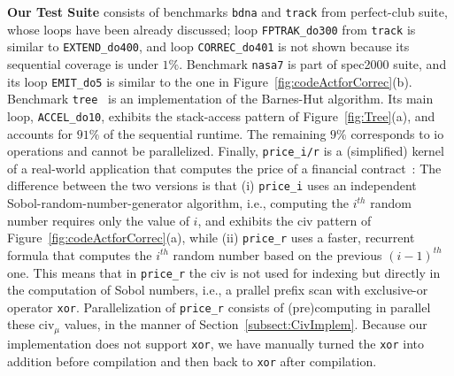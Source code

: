 \documentclass{sig-alternate}
\begin{document}
\vspace{1ex}

{\bf Our Test Suite} consists of benchmarks {\tt bdna} and {\tt track} 
from {\sc perfect-club} suite, whose loops have been already discussed;
loop {\tt FPTRAK\_do300} from {\tt track} is similar to {\tt EXTEND\_do400},
and loop {\tt CORREC\_do401} is not shown because 
its sequential coverage is under $1\%$. 
%
Benchmark {\tt nasa7} is part of {\sc spec2000} suite, and its loop {\tt EMIT\_do5}
is similar to the one in Figure~\ref{fig:codeActforCorrec}(b).
%
Benchmark {\tt tree}~\cite{Treecode} is an implementation of the Barnes-Hut algorithm.
Its main loop, {\tt ACCEL\_do10}, exhibits the stack-access pattern of Figure~\ref{fig:Tree}(a),
and accounts for $91\%$ of the sequential runtime. The remaining $9\%$ corresponds to {\sc io}
operations and cannot be parallelized.
%
Finally,  {\tt price\_i/r} is a (simplified) kernel of a real-world application that
computes the price of a financial contract~\cite{LexiFiPricing}:   The difference
between the two versions is that (i) {\tt price\_i} uses an independent Sobol-random-number-generator
algorithm, i.e., computing the $i^{th}$ random number requires only the value of $i$,
and exhibits the {\sc civ} pattern of Figure~\ref{fig:codeActforCorrec}(a), 
while (ii) {\tt price\_r} uses a faster, recurrent formula that computes the 
$i^{th}$ random number based on the previous $(i-1)^{th}$ one. 
This means that in {\tt price\_r} the {\sc civ} is not used for indexing
but directly in the computation of Sobol numbers, i.e., a prallel prefix 
scan with exclusive-or operator {\tt xor}. 
Parallelization of {\tt price\_r} consists of (pre)computing
in parallel these {\sc civ}$_\mu$ values, in the manner of 
Section~\ref{subsect:CivImplem}.  
%
Because our implementation does not support {\tt xor},
we have manually turned the {\tt xor} into addition before 
compilation and then back to {\tt xor} after compilation. 

\end{document}
